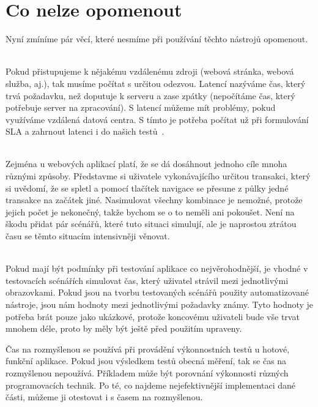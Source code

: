 \documentclass[122pt,oneside]{fithesis}
\begin{document}
\section{Co nelze opomenout}
Nyní zmíníme pár věcí, které nesmíme při používání těchto nástrojů opomenout.

\vspace{5 mm}
\\\indent Pokud přistupujeme k nějakému vzdálenému zdroji (webová stránka, webová služba, aj.), tak musíme počítat s určitou odezvou. Latencí nazýváme čas, který trvá požadavku, než doputuje k serveru a zase zpátky (nepočítáme čas, který potřebuje server na zpracování). S latencí můžeme mít problémy, pokud využíváme vzdálená datová centra. S tímto je potřeba počítat už při formulování SLA a zahrnout latenci i do našich testů~\cite{bhatt09}.

\vspace{5 mm}
\\\indent Zejména u webových aplikací platí, že se dá dosáhnout jednoho cíle mnoha různými způsoby. Představme si uživatele vykonávajícího určitou transakci, který si uvědomí, že se spletl a pomocí tlačítek navigace se přesune z půlky jedné transakce na začátek jiné. Nasimulovat všechny kombinace je nemožné, protože jejich počet je nekonečný, takže bychom se o to neměli ani pokoušet. Není na škodu přidat pár scénářů, které tuto situaci simulují, ale je naprostou ztrátou času se těmto situacím intensivněji věnovat.

\vspace{5 mm}
\\\indent Pokud mají být podmínky při testování aplikace co nejvěrohodnější, je vhodné v testovacích scénářích simulovat čas, který uživatel strávil mezi jednotlivými obrazovkami. Pokud jsou na tvorbu testovaných scénářů použity automatizované nástroje, jsou nám hodnoty mezi jednotlivými požadavky známy. Tyto hodnoty je potřeba brát pouze jako ukázkové, protože koncovému uživateli bude vše trvat mnohem déle, proto by měly být ještě před použitím upraveny.

Čas na rozmyšlenou se používá při provádění výkonnostních testů u hotové, funkční aplikace. Pokud jsou výsledkem testů obecná měření, tak se čas na rozmyšlenou nepoužívá. Příkladem může být porovnání výkonnosti různých programovacích technik. Po té, co najdeme nejefektivnější implementaci dané části, můžeme ji otestovat i s časem na rozmyšlenou.
\end{document}
